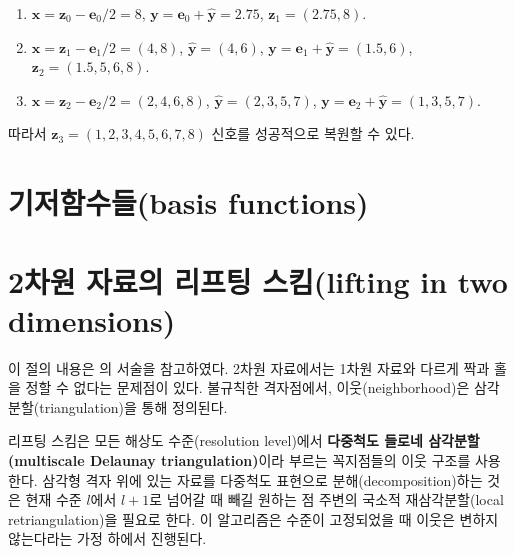\documentclass[b5paper,]{scrbook}
\theoremstyle{plain}
\theoremstyle{definition}
\numberwithin{equation}{section}
\begin{document}
\begin{enumerate}
\def\labelenumi{\arabic{enumi}.}
\item
  \(\mathbf{x}=\mathbf{z}_{0}-\mathbf{e}_{0}/2=8\), \(\mathbf{y}=\mathbf{e}_{0}+\hat{\mathbf{y}}=2.75\), \(\mathbf{z}_{1}=(2.75, 8)\).
\item
  \(\mathbf{x}=\mathbf{z}_{1}-\mathbf{e}_{1}/2=(4,8)\), \(\hat{\mathbf{y}}=(4,6)\), \(\mathbf{y}=\mathbf{e}_{1}+\hat{\mathbf{y}}=(1.5, 6)\), \(\mathbf{z}_{2}=(1.5, 5, 6, 8)\).
\item
  \(\mathbf{x}=\mathbf{z}_{2}-\mathbf{e}_{2}/2=(2,4,6,8)\), \(\hat{\mathbf{y}}=(2,3,5,7)\), \(\mathbf{y}=\mathbf{e}_{2}+\hat{\mathbf{y}}=(1,3,5,7)\).
\end{enumerate}

따라서 \(\mathbf{z}_{3}=(1,2,3,4,5,6,7,8)\) 신호를 성공적으로 복원할 수 있다.

\hypertarget{basis-functions}{%
\section{기저함수들(basis functions)}\label{basis-functions}}

\hypertarget{---lifting-in-two-dimensions}{%
\section{2차원 자료의 리프팅 스킴(lifting in two dimensions)}\label{---lifting-in-two-dimensions}}

이 절의 내용은 \citep{Jang2012}의 서술을 참고하였다. 2차원 자료에서는 1차원 자료와 다르게 짝과 홀을 정할 수 없다는 문제점이 있다. 불규칙한 격자점에서, 이웃(neighborhood)은 삼각분할(triangulation)을 통해 정의된다.

리프팅 스킴은 모든 해상도 수준(resolution level)에서 \textbf{다중척도 들로네 삼각분할(multiscale Delaunay triangulation)}이라 부르는 꼭지점들의 이웃 구조를 사용한다. 삼각형 격자 위에 있는 자료를 다중척도 표현으로 분해(decomposition)하는 것은 현재 수준 \(l\)에서 \(l+1\)로 넘어갈 때 빼길 원하는 점 주변의 국소적 재삼각분할(local retriangulation)을 필요로 한다. 이 알고리즘은 수준이 고정되었을 때 이웃은 변하지 않는다라는 가정 하에서 진행된다.
\end{document}
